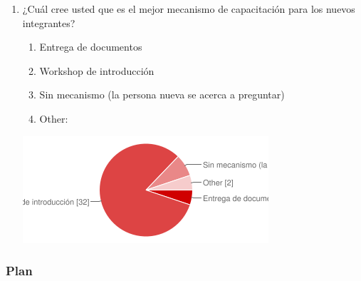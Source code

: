 \begin{enumerate}
\begin{center}
        \end{center}
	\item ¿Cuál cree usted que es el mejor mecanismo
		de capacitación para los nuevos integrantes?
		\begin{enumerate}
			\item Entrega de documentos
			\item Workshop de introducción
			\item Sin mecanismo (la persona nueva se acerca a preguntar)
			\item Other: 
		\end{enumerate}
        \begin{center}
        \includegraphics[scale=0.7]{images/encuesta2/3}
        \end{center}
\end{enumerate}

\subsubsection{Plan}

